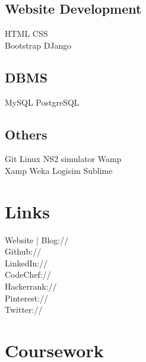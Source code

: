 \documentclass[]{resume-openfont}
\begin{document}
\begin{minipage}[t]{0.33\textwidth}
\subsection{Website Development}
HTML \textbullet{} CSS \\
Bootstrap \textbullet{} DJango
\sectionsep
\subsection{DBMS}
MySQL \textbullet{} PostgreSQL
\sectionsep
\subsection{Others}
Git \textbullet{} Linux \textbullet{} NS2 simulator \textbullet{} Wamp \\ \textbullet{} Xamp \textbullet{} Weka \textbullet{} Logisim \textbullet{} Sublime 
\sectionsep



\section{Links}
Website | Blog:// \href{https://diksha-rathi.github.io}{} \\
Github:// \href{https://github.com/Diksha-Rathi}{} \\
LinkedIn://  \href{https://www.linkedin.com/in/diksharathi}{} \\
CodeChef://  \href{https://www.codechef.com/users/codegirl1995}{} \\
Hackerrank://  \href{https://www.hackerrank.com/codegirl1995}{} \\
Pinterest:// \href{https://in.pinterest.com/diksha2895/}{} \\
Twitter://  \href{https://twitter.com/diksha_28795}{} \\
\sectionsep


\section{Coursework}

\end{minipage}
\end{document}
